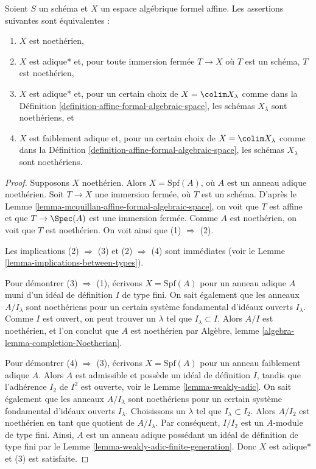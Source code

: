 \begin{lemma}
\label{lemma-characterize-noetherian-affine}
Soient $S$ un schéma et $X$ un espace algébrique formel affine.
Les assertions suivantes sont équivalentes :
\begin{enumerate}
\item $X$ est noethérien,
\item $X$ est adique* et, pour toute immersion fermée $T \to X$ où $T$ est un schéma,
$T$ est noethérien,
\item $X$ est adique* et, pour un certain choix de $X = \colim X_\lambda$ comme dans la
Définition \ref{definition-affine-formal-algebraic-space},
les schémas $X_\lambda$ sont noethériens, et
\item $X$ est faiblement adique et, pour un certain choix de $X = \colim X_\lambda$
comme dans la Définition \ref{definition-affine-formal-algebraic-space},
les schémas $X_\lambda$ sont noethériens.
\end{enumerate}
\end{lemma}

\begin{proof}
Supposons $X$ noethérien. Alors $X = \text{Spf}(A)$, où
$A$ est un anneau adique noethérien.
Soit $T \to X$ une immersion fermée, où $T$ est un schéma.
D'après le Lemme \ref{lemma-mcquillan-affine-formal-algebraic-space},
on voit que $T$ est affine et que $T \to \Spec(A)$ est une immersion
fermée. Comme $A$ est noethérien, on voit que $T$ est noethérien.
On voit ainsi que (1) $\Rightarrow$ (2).

\medskip\noindent
Les implications (2) $\Rightarrow$ (3) et (2) $\Rightarrow$ (4) sont
immédiates (voir le Lemme \ref{lemma-implications-between-types}).

\medskip\noindent
Pour démontrer (3) $\Rightarrow$ (1), écrivons $X = \text{Spf}(A)$
pour un anneau adique $A$ muni d'un idéal de définition $I$ de type fini.
On sait également que les anneaux $A/I_\lambda$ sont noethériens
pour un certain système fondamental d'idéaux ouverts $I_\lambda$.
Comme $I$ est ouvert, on peut trouver un $\lambda$ tel que $I_\lambda \subset I$.
Alors $A/I$ est noethérien, et l'on conclut que $A$ est noethérien par
Algèbre, lemme \ref{algebra-lemma-completion-Noetherian}.

\medskip\noindent
Pour démontrer (4) $\Rightarrow$ (3), écrivons $X = \text{Spf}(A)$
pour un anneau faiblement adique $A$. Alors $A$ est admissible et
possède un idéal de définition $I$, tandis que l'adhérence $I_2$ de $I^2$
est ouverte, voir le Lemme \ref{lemma-weakly-adic}.
On sait également que les anneaux $A/I_\lambda$ sont noethériens
pour un certain système fondamental d'idéaux ouverts $I_\lambda$.
Choisissons un $\lambda$ tel que $I_\lambda \subset I_2$.
Alors $A/I_2$ est noethérien en tant que quotient de $A/I_\lambda$.
Par conséquent, $I/I_2$ est un $A$-module de type fini.
Ainsi, $A$ est un anneau adique possédant un idéal de définition
de type fini par le Lemme \ref{lemma-weakly-adic-finite-generation}.
Donc $X$ est adique* et (3) est satisfaite.
\end{proof}





